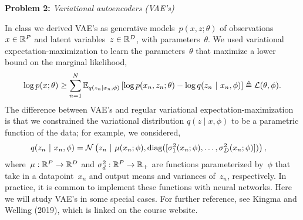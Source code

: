 \documentclass[11pt]{article}
\begin{document}
\clearpage

\textbf{Problem 2:}  \textit{Variational autoencoders (VAE's)} 

In class we derived VAE's as generative models~$p(x, z; \theta)$ of observations~$x \in \mathbb{R}^P$ and latent variables~$z \in \mathbb{R}^D$, with parameters~$\theta$.  We used variational expectation-maximization to learn the parameters~$\theta$ that maximize a lower bound on the marginal likelihood,
\begin{align*}
    \log p(x; \theta) \geq \sum_{n=1}^N \mathbb{E}_{q(z_n | x_n, \phi)}\left[\log p(x_n, z_n; \theta) - \log q(z_n ~\vert~ x_n, \phi) \right] \triangleq \mathcal{L}(\theta, \phi).
\end{align*}
The difference between VAE's and regular variational expectation-maximization is that we constrained the variational distribution $q(z \mid x, \phi)$ to be a parametric function of the data; for example, we considered,
\begin{align*}
    q(z_n ~\vert~ x_n, \phi) &= \mathcal{N} \left(z_n ~\vert~ \mu(x_n; \phi), \mathrm{diag}([\sigma_1^2(x_n; \phi), \ldots, \sigma_D^2(x_n; \phi)]) \right),
\end{align*}
where~$\mu: \mathbb{R}^P \to \mathbb{R}^D$ and $\sigma_d^2: \mathbb{R}^P \to \mathbb{R}_+$ are functions parameterized by~$\phi$ that take in a datapoint~$x_n$ and output means and variances of~$z_n$, respectively.  In practice, it is common to implement these functions with neural networks.  Here we will study VAE's in some special cases.  For further reference, see Kingma and Welling (2019), which is linked on the course website.
\end{document}

